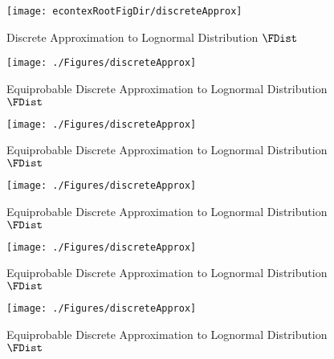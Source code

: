\begin{figure}
        \texttt{[image: econtexRootFigDir/discreteApprox]}
        \caption{Discrete Approximation to Lognormal Distribution $\FDist$}
        \label{fig:discreteapprox}
\end{figure}
  \hypertarget{discreteApprox}{}
  \begin{figure}
    \texttt{[image: ./Figures/discreteApprox]}
    \caption{Equiprobable Discrete Approximation to Lognormal Distribution $\FDist$}
    \label{fig:discreteapprox}
  \end{figure}
  \hypertarget{discreteApprox}{}
  \begin{figure}
    \texttt{[image: ./Figures/discreteApprox]}
    \caption{Equiprobable Discrete Approximation to Lognormal Distribution $\FDist$}
    \label{fig:discreteapprox}
  \end{figure}
  \hypertarget{discreteApprox}{}
  \begin{figure}
    \texttt{[image: ./Figures/discreteApprox]}
    \caption{Equiprobable Discrete Approximation to Lognormal Distribution $\FDist$}
    \label{fig:discreteapprox}
  \end{figure}
  \hypertarget{discreteApprox}{}
  \begin{figure}
    \texttt{[image: ./Figures/discreteApprox]}
    \caption{Equiprobable Discrete Approximation to Lognormal Distribution $\FDist$}
    \label{fig:discreteapprox}
  \end{figure}
  \hypertarget{discreteApprox}{}
  \begin{figure}
    \texttt{[image: ./Figures/discreteApprox]}
    \caption{Equiprobable Discrete Approximation to Lognormal Distribution $\FDist$}
    \label{fig:discreteapprox}
  \end{figure}
